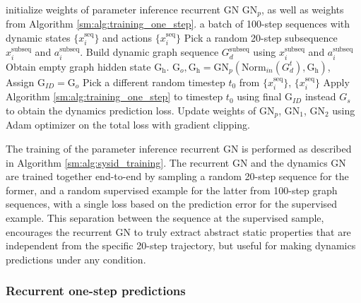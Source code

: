 \begin{algorithm}[t]
   \caption{End-to-end training algorithm for System ID.}
   \label{sm:alg:sysid_training}
\begin{algorithmic}
    initialize weights of parameter inference recurrent GN $\textrm{GN}_p$, as well as weights from Algorithm \ref{sm:alg:training_one_step}.
    a batch of 100-step sequences with dynamic states $\{x^\textrm{seq}_i\}$ and actions $\{x^\textrm{seq}_i\}$
   \STATE Pick a random 20-step subsequence $x^\textrm{subseq}_i$ and $a^\textrm{subseq}_i$.
   \STATE Build dynamic graph sequence $G^\textrm{subseq}_d$ using
   $x^\textrm{subseq}_i$ and $a^\textrm{subseq}_i$
   \STATE Obtain empty graph hidden state $\textrm{G}_\textrm{h}$.
   \STATE $\textrm{G}_{o},  \textrm{G}_\textrm{h} = \textrm{GN}_p(\textrm{Norm}_{in}(G^t_d), \textrm{G}_\textrm{h})$,
   \ENDFOR
   \STATE Assign $\textrm{G}_{ID} =\textrm{G}_{o}$
   \STATE Pick a different random timestep $t_0$ from  $\{x^\mathrm{seq}_i\}$, $\{x^\textrm{seq}_i\}$ 
   \STATE Apply Algorithm \ref{sm:alg:training_one_step} to timestep $t_0$ using final $\textrm{G}_{ID}$ instead $G_s$ to obtain the dynamics prediction loss.
   \ENDFOR
   \STATE Update weights of $\textrm{GN}_p$, $\textrm{GN}_1$, $\textrm{GN}_2$ using Adam optimizer on the total loss with gradient clipping.
\end{algorithmic}
\end{algorithm}

The training of the parameter inference recurrent GN is performed as described in Algorithm \ref{sm:alg:sysid_training}. The recurrent GN and the dynamics GN are trained together end-to-end by sampling a random 20-step sequence for the former, and a random supervised example for the latter from 100-step graph sequences, with a single loss based on the prediction error for the supervised example. This separation between the sequence at the supervised sample, encourages the recurrent GN to truly extract abstract static properties that are independent from the specific 20-step trajectory, but useful for making dynamics predictions under any condition.


\subsubsection{Recurrent one-step predictions}
\label{sm:sec:training_recurrent}

